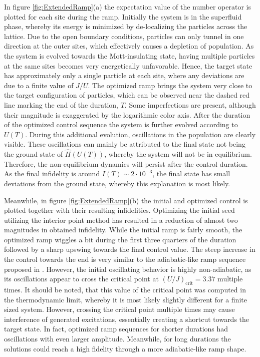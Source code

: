 In figure \ref{fig:ExtendedRamp}(a) the expectation value of the number operator is plotted for each site during the ramp. Initially the system is in the superfluid phase, whereby its energy is minimized by de-localizing the particles across the lattice. Due to the open boundary conditions, particles can only tunnel in one direction at the outer sites, which effectively causes a depletion of population. 
As the system is evolved towards the Mott-insulating state, having multiple particles at the same sites becomes very energetically unfavorable. Hence, the target state has approximately only a single particle at each site, where any deviations are due to a finite value of $J/U$.
The optimized ramp brings the system very close to the target configuration of particles, which can be observed near the dashed red line marking the end of the duration, $T$. Some imperfections are present, although their magnitude is exaggerated by the logarithmic color axis.
After the duration of the optimized control sequence the system is further evolved according to $U(T)$. During this additional evolution, oscillations in the population are clearly visible. These oscillations can mainly be attributed to the final state not being the ground state of $\hat{H}(U(T))$, whereby the system will not be in equilibrium. Therefore, the non-equilibrium dynamics will persist after the control duration. As the final infidelity is around $I(T) \sim 2 \cdot 10^{-3}$, the final state has small deviations from the ground state, whereby this explanation is most likely. 

Meanwhile, in figure \ref{fig:ExtendedRamp}(b) the initial and optimized control is plotted together with their resulting infidelities. Optimizing the initial seed utilizing the interior point method has resulted in a reduction of almost two magnitudes in obtained infidelity.
While the initial ramp is fairly smooth, the optimized ramp wiggles a bit during the first three quarters of the duration followed by a sharp upswing towards the final control value. The steep increase in the control towards the end is very similar to the adiabatic-like ramp sequence proposed in \cite{Zakrzewski2009}. However, the initial oscillating behavior is highly non-adiabatic, as its oscillations appear to cross the critical point at $(U/J)_{\mathrm{crit}} = 3.37$ multiple times. It should be noted, that this value of the critical point was computed in the thermodynamic limit, whereby it is most likely slightly different for a finite sized system. However, crossing the critical point multiple times may cause interference of generated excitations, essentially creating a shortcut towards the target state. 
In fact, optimized ramp sequences for shorter durations had oscillations with even larger amplitude. Meanwhile, for long durations the solutions could reach a high fidelity through a more adiabatic-like ramp shape.


